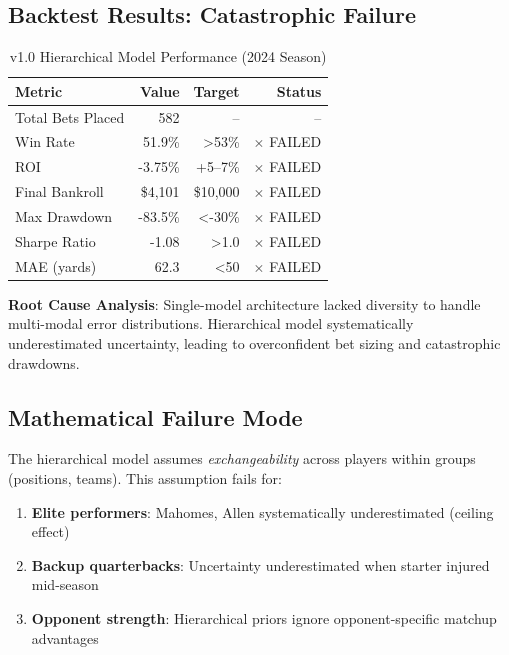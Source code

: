 \subsection{Backtest Results: Catastrophic Failure}

\begin{table}[h]
\centering
\caption{v1.0 Hierarchical Model Performance (2024 Season)}
\label{tab:v1-performance}
\begin{tabular}{lrrr}
\toprule
\textbf{Metric} & \textbf{Value} & \textbf{Target} & \textbf{Status} \\
\midrule
Total Bets Placed & 582 & -- & -- \\
Win Rate & 51.9\% & >53\% & $\times$ FAILED \\
ROI & -3.75\% & +5--7\% & $\times$ FAILED \\
Final Bankroll & \$4,101 & \$10,000 & $\times$ FAILED \\
Max Drawdown & -83.5\% & <-30\% & $\times$ FAILED \\
Sharpe Ratio & -1.08 & >1.0 & $\times$ FAILED \\
MAE (yards) & 62.3 & <50 & $\times$ FAILED \\
\bottomrule
\end{tabular}
\end{table}

\textbf{Root Cause Analysis}: Single-model architecture lacked diversity to handle multi-modal error distributions. Hierarchical model systematically underestimated uncertainty, leading to overconfident bet sizing and catastrophic drawdowns.

\subsection{Mathematical Failure Mode}

The hierarchical model assumes \textit{exchangeability} across players within groups (positions, teams). This assumption fails for:

\begin{enumerate}
\item \textbf{Elite performers}: Mahomes, Allen systematically underestimated (ceiling effect)
\item \textbf{Backup quarterbacks}: Uncertainty underestimated when starter injured mid-season
\item \textbf{Opponent strength}: Hierarchical priors ignore opponent-specific matchup advantages
\end{enumerate}

